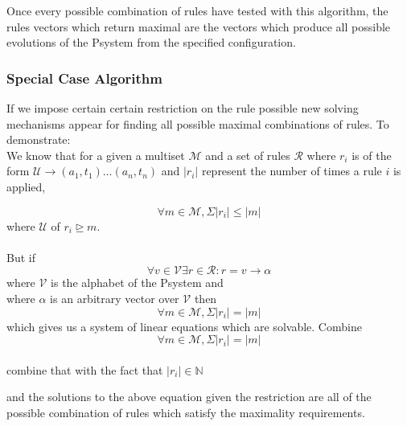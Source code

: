 \documentclass[runningheads]{llncs}
\begin{document}
Once every possible combination of rules have tested with this algorithm, the rules vectors which return maximal are the vectors which produce all possible evolutions of the Psystem from the specified configuration. 

\subsubsection*{ Special Case Algorithm}

If we impose certain certain restriction on the rule possible new solving mechanisms appear for finding all possible maximal combinations of rules. To demonstrate: \\

We know that for a given a multiset $\mathcal{M}$ and a set of rules $\mathcal{R}$ where $r_i$ is of the form $\mathcal{U} \rightarrow (a_1,t_1) \ldots (a_n,t_n)$ and $|r_i|$ represent the number of times a rule $i$ is applied, 

\begin{equation}
    \forall m \in \mathcal{M}, \Sigma |r_i| \leq |m| 
\end{equation}
where $\mathcal{U}$ of $r_i \unrhd m$. \\ \\
But if
\begin{equation}
    \forall v \in  \mathcal{V} \exists r \in \mathcal{R} : r = v \rightarrow \alpha   
\end{equation}
where $\mathcal{V}$ is the alphabet of the Psystem and \\
where $\alpha$ is an arbitrary vector over $\mathcal{V}$
then 
\begin{equation}
    \forall m \in \mathcal{M}, \Sigma |r_i| = |m| 
\end{equation}
which gives us a system of linear equations which are solvable. Combine 
\begin{equation}
    \forall m \in \mathcal{M}, \Sigma |r_i| = |m| 
\end{equation} \\
combine that with the fact that $|r_i| \in \mathbb{N}$

and the solutions to the above equation given the restriction are all of the possible combination of rules which satisfy the maximality requirements.
\end{document}
